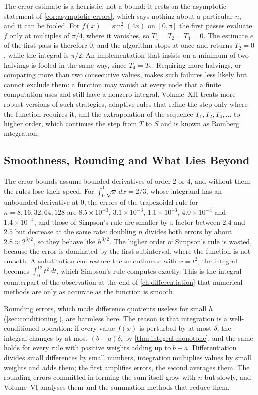 The error estimate is a heuristic, not a bound: it rests on the asymptotic statement of \cref{cor:asymptotic-errors}, which says nothing about a particular $n$, and it can be fooled. For $f(x)=\sin^2(4x)$ on $[0,\pi]$ the first passes evaluate $f$ only at multiples of $\pi/4$, where it vanishes, so $T_1=T_2=T_4=0$. The estimate $e$ of the first pass is therefore $0$, and the algorithm stops at once and returns $T_2=0$, while the integral is $\pi/2$. An implementation that insists on a minimum of two halvings is fooled in the same way, since $T_4=T_2$. Requiring more halvings, or comparing more than two consecutive values, makes such failures less likely but cannot exclude them: a function may vanish at every node that a finite computation uses and still have a nonzero integral. Volume~XII treats more robust versions of such strategies, adaptive rules that refine the step only where the function requires it, and the extrapolation of the sequence $T_1,T_2,T_4,\ldots$ to higher order, which continues the step from $T$ to $S$ and is known as Romberg integration.

\subsection{Smoothness, Rounding and What Lies Beyond}

The error bounds assume bounded derivatives of order $2$ or $4$, and without them the rules lose their speed. For $\int_0^1\sqrt x\,dx=2/3$, whose integrand has an unbounded derivative at $0$, the errors of the trapezoidal rule for $n=8,16,32,64,128$ are $8.5\times10^{-3}$, $3.1\times10^{-3}$, $1.1\times10^{-3}$, $4.0\times10^{-4}$ and $1.4\times10^{-4}$, and those of Simpson's rule are smaller by a factor between $2.4$ and $2.5$ but decrease at the same rate: doubling $n$ divides both errors by about $2.8\approx2^{3/2}$, so they behave like $h^{3/2}$. The higher order of Simpson's rule is wasted, because the error is dominated by the first subinterval, where the function is not smooth. A substitution can restore the smoothness: with $x=t^2$, the integral becomes $\int_0^12t^2\,dt$, which Simpson's rule computes exactly. This is the integral counterpart of the observation at the end of \cref{ch:differentiation} that numerical methods are only as accurate as the function is smooth.

Rounding errors, which made difference quotients useless for small $h$ (\cref{sec:conditioning}), are harmless here. The reason is that integration is a well-conditioned operation: if every value $f(x)$ is perturbed by at most $\delta$, the integral changes by at most $(b-a)\delta$, by \cref{thm:integral-monotone}, and the same holds for every rule with positive weights adding up to $b-a$. Differentiation divides small differences by small numbers, integration multiplies values by small weights and adds them; the first amplifies errors, the second averages them. The rounding errors committed in forming the sum itself grow with $n$ but slowly, and Volume~VI analyses them and the summation methods that reduce them.

